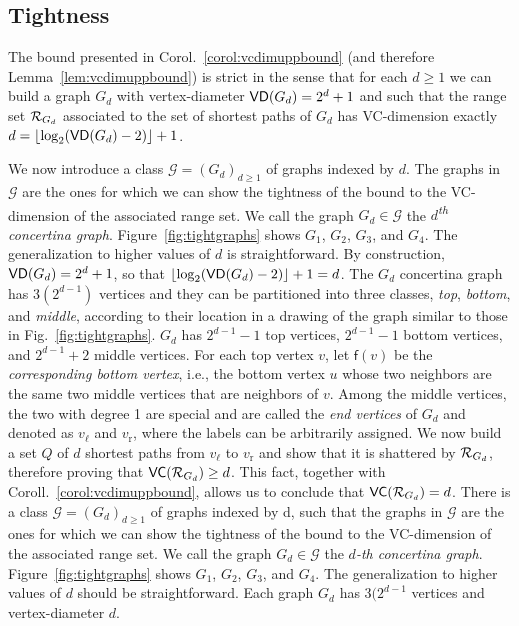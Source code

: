 \subsection{Tightness}\label{sec:tightness}
The bound presented in Corol.~\ref{corol:vcdimuppbound} (and therefore
Lemma~\ref{lem:vcdimuppbound}) is strict in the sense that
for each $d\ge 1$ we can build a graph $G_d$ with vertex-diameter
$\mathsf{VD}(G_d)=2^d+1$ and such that the range set $\mathcal{R}_{G_d}$ associated to the set of
shortest paths of $G_d$ has VC-dimension exactly
$d=\lfloor\log_2(\mathsf{VD}(G_d)-2)\rfloor+1$. 

\ifproof
We now introduce a class $\mathcal{G}=(G_d)_{d\ge 1}$ of graphs indexed by $d$.
The graphs in $\mathcal{G}$ are the ones for which we can show the tightness of
the bound to the VC-dimension of the associated range set.
We call the graph $G_d\in\mathcal{G}$ the \emph{$d$\textsuperscript{th} concertina graph}.
Figure~\ref{fig:tightgraphs} shows $G_1$, $G_2$, $G_3$, and $G_4$. The
generalization to higher values of $d$ is straightforward.
By construction, $\mathsf{VD}(G_d)=2^d+1$, so that
$\lfloor\log_2(\mathsf{VD}(G_d)-2)\rfloor+1=d$. The $G_d$ concertina graph has 
$3(2^{d-1})$ vertices and they can be partitioned into three classes,
\emph{top}, \emph{bottom}, and \emph{middle},
according to their location in a drawing of the graph similar to those in
Fig.~\ref{fig:tightgraphs}. $G_d$ has $2^{d-1}-1$ top vertices, $2^{d-1}-1$ bottom vertices, and
$2^{d-1}+2$ middle vertices. For each top vertex $v$, let $\mathsf{f}(v)$ be the
\emph{corresponding bottom vertex}, i.e., the bottom vertex $u$ whose two neighbors
are the same two middle vertices that are neighbors of $v$. Among the middle
vertices, the two with degree 1 are special and are called the \emph{end
vertices} of $G_d$ and denoted as $v_\ell$ and $v_\mathrm{r}$, where the
labels can be arbitrarily assigned. We now build a set $Q$ of $d$
shortest paths from $v_\ell$ to $v_\mathrm{r}$ and show that it is
shattered by $\mathcal{R}_{G_d}$, therefore proving that $\mathsf{VC}(\mathcal{R}_{G_d})\ge d$.
This fact, together with Coroll.~\ref{corol:vcdimuppbound}, allows us to conclude
that $\mathsf{VC}(\mathcal{R}_{G_d})=d$. 
\else
There is a class $\mathcal{G}=(G_d)_{d\ge 1}$ of graphs indexed by d, such that
the graphs in $\mathcal{G}$ are the ones for which we can show the tightness of
the bound to the VC-dimension of the associated range set. We call the graph
$G_d\in\mathcal{G}$ the \emph{$d$-th concertina graph}.
Figure~\ref{fig:tightgraphs} shows $G_1$, $G_2$, $G_3$, and $G_4$. The
generalization to higher values of $d$ should be straightforward. Each graph
$G_d$ has $3(2^{d-1}$ vertices and vertex-diameter $d$.

